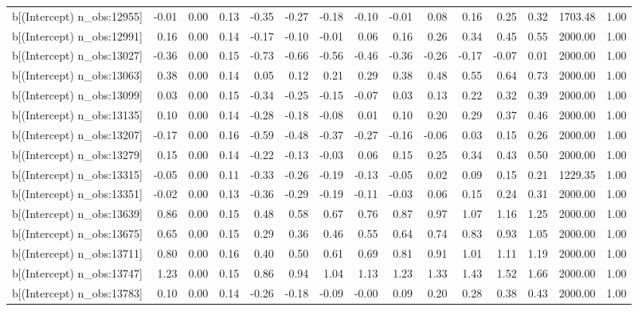 \begin{table}[ht]
\begin{tabular}{rrrrrrrrrrrrrrr}
  b[(Intercept) n\_obs:12955] & -0.01 & 0.00 & 0.13 & -0.35 & -0.27 & -0.18 & -0.10 & -0.01 & 0.08 & 0.16 & 0.25 & 0.32 & 1703.48 & 1.00 \\ 
  b[(Intercept) n\_obs:12991] & 0.16 & 0.00 & 0.14 & -0.17 & -0.10 & -0.01 & 0.06 & 0.16 & 0.26 & 0.34 & 0.45 & 0.55 & 2000.00 & 1.00 \\ 
  b[(Intercept) n\_obs:13027] & -0.36 & 0.00 & 0.15 & -0.73 & -0.66 & -0.56 & -0.46 & -0.36 & -0.26 & -0.17 & -0.07 & 0.01 & 2000.00 & 1.00 \\ 
  b[(Intercept) n\_obs:13063] & 0.38 & 0.00 & 0.14 & 0.05 & 0.12 & 0.21 & 0.29 & 0.38 & 0.48 & 0.55 & 0.64 & 0.73 & 2000.00 & 1.00 \\ 
  b[(Intercept) n\_obs:13099] & 0.03 & 0.00 & 0.15 & -0.34 & -0.25 & -0.15 & -0.07 & 0.03 & 0.13 & 0.22 & 0.32 & 0.39 & 2000.00 & 1.00 \\ 
  b[(Intercept) n\_obs:13135] & 0.10 & 0.00 & 0.14 & -0.28 & -0.18 & -0.08 & 0.01 & 0.10 & 0.20 & 0.29 & 0.37 & 0.46 & 2000.00 & 1.00 \\ 
  b[(Intercept) n\_obs:13207] & -0.17 & 0.00 & 0.16 & -0.59 & -0.48 & -0.37 & -0.27 & -0.16 & -0.06 & 0.03 & 0.15 & 0.26 & 2000.00 & 1.00 \\ 
  b[(Intercept) n\_obs:13279] & 0.15 & 0.00 & 0.14 & -0.22 & -0.13 & -0.03 & 0.06 & 0.15 & 0.25 & 0.34 & 0.43 & 0.50 & 2000.00 & 1.00 \\ 
  b[(Intercept) n\_obs:13315] & -0.05 & 0.00 & 0.11 & -0.33 & -0.26 & -0.19 & -0.13 & -0.05 & 0.02 & 0.09 & 0.15 & 0.21 & 1229.35 & 1.00 \\ 
  b[(Intercept) n\_obs:13351] & -0.02 & 0.00 & 0.13 & -0.36 & -0.29 & -0.19 & -0.11 & -0.03 & 0.06 & 0.15 & 0.24 & 0.31 & 2000.00 & 1.00 \\ 
  b[(Intercept) n\_obs:13639] & 0.86 & 0.00 & 0.15 & 0.48 & 0.58 & 0.67 & 0.76 & 0.87 & 0.97 & 1.07 & 1.16 & 1.25 & 2000.00 & 1.00 \\ 
  b[(Intercept) n\_obs:13675] & 0.65 & 0.00 & 0.15 & 0.29 & 0.36 & 0.46 & 0.55 & 0.64 & 0.74 & 0.83 & 0.93 & 1.05 & 2000.00 & 1.00 \\ 
  b[(Intercept) n\_obs:13711] & 0.80 & 0.00 & 0.16 & 0.40 & 0.50 & 0.61 & 0.69 & 0.81 & 0.91 & 1.01 & 1.11 & 1.19 & 2000.00 & 1.00 \\ 
  b[(Intercept) n\_obs:13747] & 1.23 & 0.00 & 0.15 & 0.86 & 0.94 & 1.04 & 1.13 & 1.23 & 1.33 & 1.43 & 1.52 & 1.66 & 2000.00 & 1.00 \\ 
  b[(Intercept) n\_obs:13783] & 0.10 & 0.00 & 0.14 & -0.26 & -0.18 & -0.09 & -0.00 & 0.09 & 0.20 & 0.28 & 0.38 & 0.43 & 2000.00 & 1.00 \\ 

\end{tabular}
\end{table}
